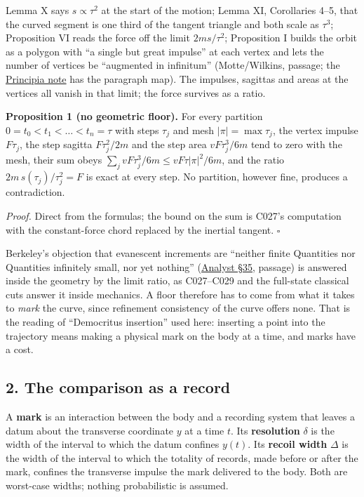 \documentclass[11pt,a4paper]{article}
\begin{document}
Lemma X says \(s\propto\tau^2\) at the start of the motion; Lemma XI,
Corollaries 4--5, that the curved segment is one third of the tangent
triangle and both scale as \(\tau^3\); Proposition VI reads the force
off the limit \(2ms/\tau^2\); Proposition I builds the orbit as a
polygon with ``a single but great impulse'' at each vertex and lets the
number of vertices be ``augmented in infinitum'' (Motte/Wilkins,
passage; the \href{principia-constant-force-action.md}{Principia note}
has the paragraph map). The impulses, sagittas and areas at the vertices
all vanish in that limit; the force survives as a ratio.

\textbf{Proposition 1 (no geometric floor).} For every partition
\(0=t_0<t_1<\dots<t_n=\tau\) with steps \(\tau_j\) and mesh
\(|\pi|=\max\tau_j\), the vertex impulse \(F\tau_j\), the step sagitta
\(F\tau_j^2/2m\) and the step area \(vF\tau_j^3/6m\) tend to zero with
the mesh, their sum obeys \(\sum_jvF\tau_j^3/6m\le vF\tau|\pi|^2/6m\),
and the ratio \(2m\,s(\tau_j)/\tau_j^2=F\) is exact at every step. No
partition, however fine, produces a contradiction.

\emph{Proof.} Direct from the formulas; the bound on the sum is C027's
computation with the constant-force chord replaced by the inertial
tangent. \(\square\)

Berkeley's objection that evanescent increments are ``neither finite
Quantities nor Quantities infinitely small, nor yet nothing''
(\href{../docs/classics/Berkeley_Analyst_1734_Wilkins.md}{Analyst §35},
passage) is answered inside the geometry by the limit ratio, as
C027--C029 and the full-state classical cuts answer it inside mechanics.
A floor therefore has to come from what it takes to \emph{mark} the
curve, since refinement consistency of the curve offers none. That is
the reading of ``Democritus insertion'' used here: inserting a point
into the trajectory means making a physical mark on the body at a time,
and marks have a cost.

\hypertarget{the-comparison-as-a-record}{%
\subsection{2. The comparison as a
record}\label{the-comparison-as-a-record}}

A \textbf{mark} is an interaction between the body and a recording
system that leaves a datum about the transverse coordinate \(y\) at a
time \(t\). Its \textbf{resolution} \(\delta\) is the width of the
interval to which the datum confines \(y(t)\). Its \textbf{recoil width}
\(\Delta\) is the width of the interval to which the totality of
records, made before or after the mark, confines the transverse impulse
the mark delivered to the body. Both are worst-case widths; nothing
probabilistic is assumed.
\end{document}
